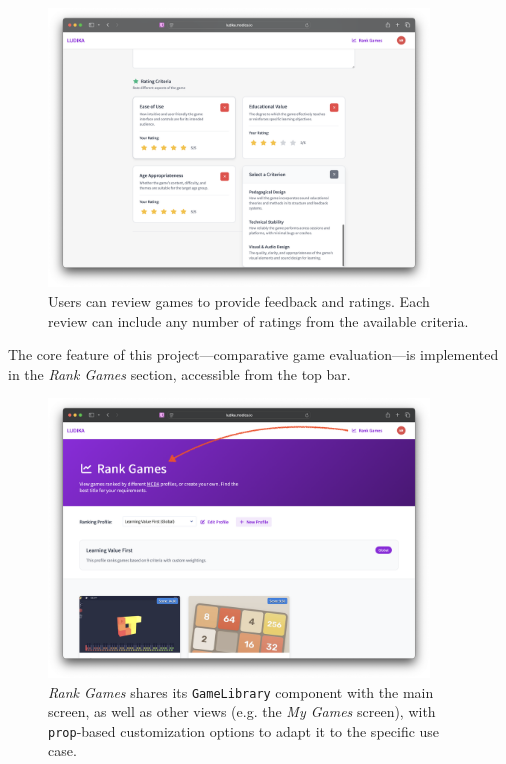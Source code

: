 \documentclass[11pt,italian,a4paper]{article}
\begin{document}
\begin{figure}[H]
    \centering
    \includegraphics[width=0.9\textwidth,trim={0 1cm 0 1cm}]{figures/edit_review.png}
    \caption{Users can review games to provide feedback and ratings. Each review can include any number of ratings from the available criteria.}
\end{figure}

The core feature of this project---comparative game evaluation---is implemented in the \textit{Rank Games} section, accessible from the top bar.

\begin{figure}[H]
    \centering
    \includegraphics[width=0.9\textwidth,trim={0 1cm 0 1cm}]{figures/rank_games.png}
    \caption{\textit{Rank Games} shares its \texttt{GameLibrary} component with the main screen, as well as other views (e.g. the \textit{My Games} screen), with \texttt{prop}-based customization options to adapt it to the specific use case.}
\end{figure}
\end{document}
